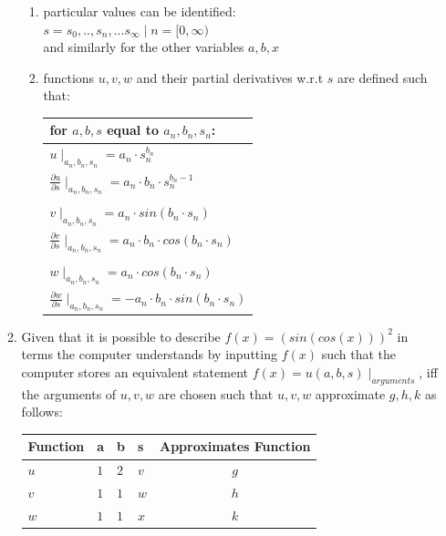 \documentclass[preprint,12pt]{elsarticle}
\providecommand{\DIFaddtex}[1]{{\protect\color{blue}\uwave{#1}}} %
\providecommand{\DIFdeltex}[1]{{\protect\color{red}\sout{#1}}}                      %
\providecommand{\DIFaddbegin}{} %
\providecommand{\DIFaddend}{} %
\providecommand{\DIFdelbegin}{} %
\providecommand{\DIFdelend}{} %
\providecommand{\DIFadd}[1]{\texorpdfstring{\DIFaddtex{#1}}{#1}} %
\providecommand{\DIFdel}[1]{\texorpdfstring{\DIFdeltex{#1}}{}} %
\begin{document}
\begin{enumerate}
\begin{enumerate}
\begin{enumerate}
\item
particular values can be identified: \\
$s = s_0,..,s_n,...s_{\infty} \mid n=[0,\infty)$ \\ 
and similarly for the other variables $a,b,x$ \\
\item
functions $u,v,w$ and their partial derivatives w.r.t $s$ are defined such that: \\
\begin{tabular}{l}
for $a, b, s$ equal to $a_n, b_n, s_n$: \\ \hline
$u \mid _{a_n, b_n, s_n} = a_n \cdot s_n^{b_n}$ \\
$\frac{\partial{u}}{\partial{s}} \mid _{a_n, b_n, s_n} = a_n \cdot b_n \cdot s_n^{b_n - 1}$ \\
\\
$v \mid _{a_n, b_n, s_n} = a_n \cdot sin(b_n \cdot s_n)$ \\
$\frac{\partial{v}}{\partial{s}} \mid _{a_n, b_n, s_n} = a_n \cdot b_n \cdot cos(b_n \cdot s_n)$ \\ 
\\
$w \mid _{a_n, b_n, s_n} = a_n \cdot cos(b_n \cdot s_n)$ \\
$\frac{\partial{w}}{\partial{s}} \mid _{a_n, b_n, s_n} = -a_n \cdot b_n \cdot sin(b_n \cdot s_n)$\\
\end{tabular} 
\end{enumerate}
\item 
\label{abcvalues}
Given that it is possible to describe \DIFdelbegin \DIFdel{$f(x) = (sin(cos(x)))^2$ }\DIFdelend \DIFaddbegin \DIFadd{$f(x) = (\sin(\cos(x)))^2$ }\DIFaddend in terms the computer understands by inputting
$f(x)$ such that the computer stores an equivalent statement $f(x) = u(a, b, s) \mid_{arguments}$,
iff the arguments of $u,v,w$ are chosen such that $u,v,w$ approximate $g,h,k$ as follows:\\
\begin{tabular}{l l l l | c}
	Function & a & b & s & Approximates Function\\ \hline 
	$u$ & $1$ & $2$ & $v$ & $g$\\ \hline 
	$v$ & $1$ & $1$ & $w$ & $h$\\ \hline 
	$w$ & $1$ & $1$ & $x$ & $k$\\ \hline 	
\end{tabular}
\end{enumerate} 


\end{enumerate}
\end{document}
